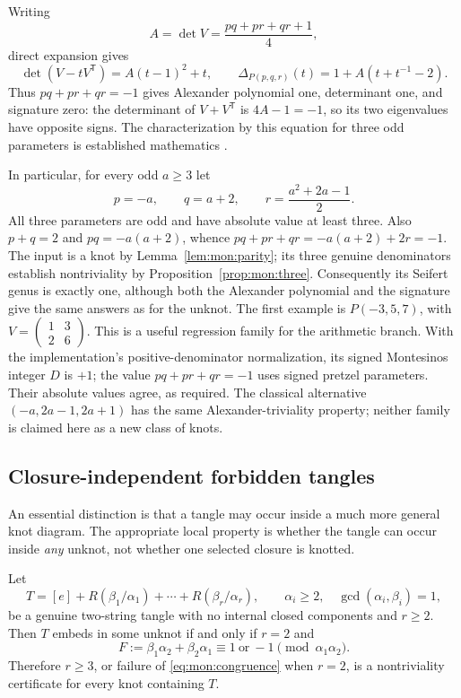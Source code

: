 Writing
\[
 A=\det V=\frac{pq+pr+qr+1}{4},
\]
direct expansion gives
\[
 \det(V-tV^{\mathsf T})=A(t-1)^2+t,
 \qquad
 \Delta_{P(p,q,r)}(t)=1+A(t+t^{-1}-2).
\]
Thus $pq+pr+qr=-1$ gives Alexander polynomial one, determinant one, and
signature zero: the determinant of $V+V^{\mathsf T}$ is $4A-1=-1$, so its
two eigenvalues have opposite signs.  The characterization by this equation
for three odd parameters is established mathematics
\cite[Section~2.3]{belousov-pretzel}.

In particular, for every odd $a\ge3$ let
\begin{equation}\label{eq:mon:family}
 p=-a,\qquad q=a+2,\qquad r=\frac{a^2+2a-1}{2}.
\end{equation}
All three parameters are odd and have absolute value at least three.  Also
$p+q=2$ and $pq=-a(a+2)$, whence
$pq+pr+qr=-a(a+2)+2r=-1$.  The input is a knot by
Lemma~\ref{lem:mon:parity}; its three genuine denominators establish
nontriviality by Proposition~\ref{prop:mon:three}.  Consequently its Seifert
genus is exactly one, although both the Alexander polynomial and the
signature give the same answers as for the unknot.  The first example is
$P(-3,5,7)$, with
$V=\left(\begin{smallmatrix}1&3\\2&6\end{smallmatrix}\right)$.
This is a useful regression family for the arithmetic branch. With the
implementation's positive-denominator normalization, its signed
Montesinos integer $D$ is $+1$; the value $pq+pr+qr=-1$ uses signed
pretzel parameters. Their absolute values agree, as required.  The classical
alternative $(-a,2a-1,2a+1)$ has the same Alexander-triviality property;
neither family is claimed here as a new class of knots.

\subsection{Closure-independent forbidden tangles}

An essential distinction is that a tangle may occur inside a much more general
knot diagram.  The appropriate local property is whether the tangle can occur
inside \emph{any} unknot, not whether one selected closure is knotted.

\begin{theorem}
\label{thm:mon:local}
Let
\[
 T=[e]+R(\beta_1/\alpha_1)+\cdots+R(\beta_r/\alpha_r),
 \qquad \alpha_i\ge2,\quad\gcd(\alpha_i,\beta_i)=1,
\]
be a genuine two-string tangle with no internal closed components and
$r\ge2$.  Then $T$ embeds in some unknot if and only if $r=2$ and
\begin{equation}\label{eq:mon:congruence}
 F:=\beta_1\alpha_2+\beta_2\alpha_1
 \equiv1\ \text{or}\ -1\pmod{\alpha_1\alpha_2}.
\end{equation}
Therefore $r\ge3$, or failure of \eqref{eq:mon:congruence} when $r=2$,
is a nontriviality certificate for every knot containing $T$.
\end{theorem}

